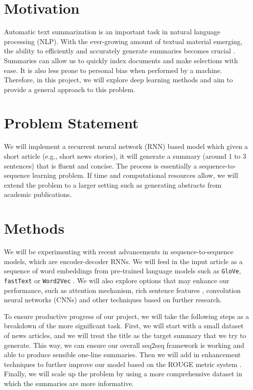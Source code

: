 \section{Motivation}
Automatic text summarization is an important task in natural language processing (NLP). With the ever-growing amount of textual material emerging, the ability to efficiently and accurately generate summaries becomes crucial \cite{gambhir2017recent}. Summaries can allow us to quickly index documents and make selections with ease. It is also less prone to personal bias when performed by a machine. Therefore, in this project, we will explore deep learning methods and aim to provide a general approach to this problem.

\section{Problem Statement}
We will implement a recurrent neural network (RNN) based model which given a short article (e.g., short news stories), it will generate a summary (around 1 to 3 sentences) that is fluent and concise. The process is essentially a sequence-to-sequence learning problem. If time and computational resources allow, we will extend the problem to a larger setting such as generating abstracts from academic publications. 


\section{Methods}
We will be experimenting with recent advancements in sequence-to-sequence models, which are encoder-decoder RNNs. We will feed in the input article as a sequence of word embeddings from pre-trained language models such as \texttt{GloVe}, \texttt{fastText} or \texttt{Word2Vec} \cite{pennington2014glove, bojanowski2017enriching, mikolov2013efficient}. We will also explore options that may enhance our performance, such as attention mechanism, rich sentence features \cite{nallapati2016abstractive}, convolution neural networks (CNNs) and other techniques based on further research. 

To ensure productive progress of our project, we will take the following steps as a breakdown of the more significant task. First, we will start with a small dataset of news articles, and we will treat the title as the target summary that we try to generate. This way, we can ensure our overall seq2seq framework is working and able to produce sensible one-line summaries. Then we will add in enhancement techniques to further improve our model based on the ROUGE metric system \cite{lin2004rouge}. Finally, we will scale up the problem by using a more comprehensive dataset in which the summaries are more informative. 


